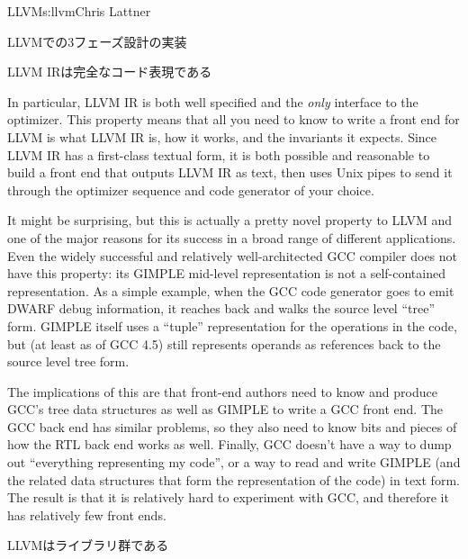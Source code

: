 \begin{aosachapter}{LLVM}{s:llvm}{Chris Lattner}
\begin{aosasect1}{LLVMでの3フェーズ設計の実装}

\begin{aosasect2}{LLVM IRは完全なコード表現である}

In particular, LLVM IR is both well specified and the \emph{only}
interface to the optimizer.  This property means that all you need to
know to write a front end for LLVM is what LLVM IR is, how it works,
and the invariants it expects.  Since LLVM IR has a first-class
textual form, it is both possible and reasonable to build a front end
that outputs LLVM IR as text, then uses Unix pipes to send it through
the optimizer sequence and code generator of your choice.

It might be surprising, but this is actually a pretty novel property
to LLVM and one of the major reasons for its success in a broad range
of different applications.  Even the widely successful and relatively
well-architected GCC compiler does not have this property: its GIMPLE
mid-level representation is not a self-contained representation.  As a
simple example, when the GCC code generator goes to emit DWARF debug
information, it reaches back and walks the source level ``tree'' form.
GIMPLE itself uses a ``tuple'' representation for the operations in
the code, but (at least as of GCC 4.5) still represents operands as
references back to the source level tree form.

The implications of this are that front-end authors need to know and
produce GCC's tree data structures as well as GIMPLE to write a GCC
front end.  The GCC back end has similar problems, so they also need to
know bits and pieces of how the RTL back end works as well.  Finally,
GCC doesn't have a way to dump out ``everything representing my
code'', or a way to read and write GIMPLE (and the related data
structures that form the representation of the code) in text form.
The result is that it is relatively hard to experiment with GCC, and
therefore it has relatively few front ends.

\end{aosasect2}

\begin{aosasect2}{LLVMはライブラリ群である}


\end{aosasect2}
\end{aosasect1}
\end{aosachapter}
